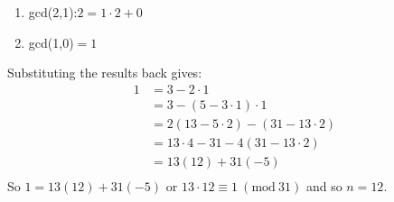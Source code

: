 \documentclass[12pt,letterpaper, onecolumn]{exam}
\newcommand{\Mod}[1]{\ (\mathrm{mod}\ #1)}
\begin{document}
\begin{questions}
\begin{solution}
\begin{enumerate}[label=(\alph*)]
					\item gcd(2,1):$2=1\cdot2+0$
					\item gcd(1,0)$=1$
				\end{enumerate}
				Substituting the results back gives:
				\begin{align*}
					1&=3-2\cdot1\\
					&=3-(5-3\cdot1)\cdot1\tag*{By (c)}\\
					&=2(13-5\cdot2)-(31-13\cdot2)\tag{By algebra \& (a)}\\
					&=13\cdot4-31-4(31-13\cdot2)\tag*{By algebra \& (a)}\\
					&=13(12)+31(-5)\\
				\end{align*}
				So $1=13(12)+31(-5)$ or $13\cdot12\equiv1\Mod{31}$ and so $n=12$.
			\end{solution}
	\end{questions}
	
\end{document}
